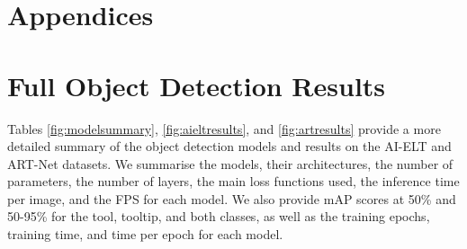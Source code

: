\section{Appendices}

\appendix

\section{Full Object Detection Results}

Tables \ref{fig:modelsummary}, \ref{fig:aieltresults}, and \ref{fig:artresults} provide a more detailed summary of the object detection models and results on the AI-ELT and ART-Net datasets. We summarise the models, their architectures, the number of parameters, the number of layers, the main loss functions used, the inference time per image, and the FPS for each model. We also provide mAP scores at 50\% and 50-95\% for the tool, tooltip, and both classes, as well as the training epochs, training time, and time per epoch for each model.

